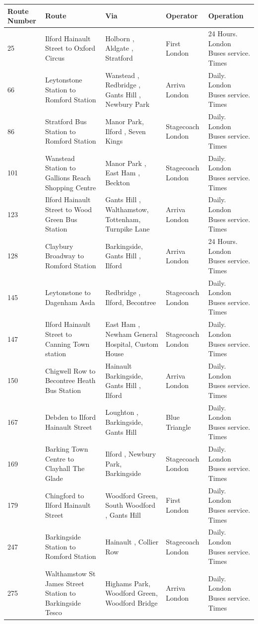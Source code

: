 \documentclass{article}
\begin{document}
\begin{tabular}{lllll}
\toprule
Route Number & Route & Via & Operator & Operation \\
\midrule
25 & Ilford Hainault Street to Oxford Circus & Holborn , Aldgate , Stratford & First London & 24 Hours. London Buses service. Times \\
66 & Leytonstone Station to Romford Station & Wanstead , Redbridge , Gants Hill , Newbury Park & Arriva London & Daily. London Buses service. Times \\
86 & Stratford Bus Station to Romford Station & Manor Park, Ilford , Seven Kings & Stagecoach London & Daily. London Buses service. Times \\
101 & Wanstead Station to Gallions Reach Shopping Centre & Manor Park , East Ham , Beckton & Stagecoach London & Daily. London Buses service. Times \\
123 & Ilford Hainault Street to Wood Green Bus Station & Gants Hill , Walthamstow, Tottenham, Turnpike Lane & Arriva London & Daily. London Buses service. Times \\
128 & Claybury Broadway to Romford Station & Barkingside, Gants Hill , Ilford & Arriva London & 24 Hours. London Buses service. Times \\
145 & Leytonstone to Dagenham Asda & Redbridge , Ilford, Becontree & Stagecoach London & Daily. London Buses service. Times \\
147 & Ilford Hainault Street to Canning Town station & East Ham , Newham General Hospital, Custom House & Stagecoach London & Daily. London Buses service. Times \\
150 & Chigwell Row to Becontree Heath Bus Station & Hainault Barkingside, Gants Hill , Ilford & Arriva London & Daily. London Buses service. Times \\
167 & Debden to Ilford Hainault Street & Loughton , Barkingside, Gants Hill & Blue Triangle & Daily. London Buses service. Times \\
169 & Barking Town Centre to Clayhall The Glade & Ilford , Newbury Park, Barkingside & Stagecoach London & Daily. London Buses service. Times \\
179 & Chingford to Ilford Hainault Street & Woodford Green, South Woodford , Gants Hill & First London & Daily. London Buses service. Times \\
247 & Barkingside Station to Romford Station & Hainault , Collier Row & Stagecoach London & Daily. London Buses service. Times \\
275 & Walthamstow St James Street Station to Barkingside Tesco & Highams Park, Woodford Green, Woodford Bridge & Arriva London & Daily. London Buses service. Times \\

\end{tabular}
\end{document}
